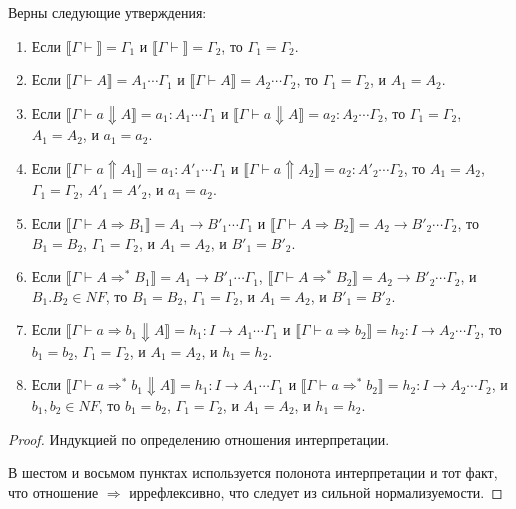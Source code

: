 \documentclass{amsart}
\theoremstyle{definition}
\theoremstyle{remark}
\newcommand{\red}{\Rightarrow}
\renewcommand{\ll}{\llbracket}
\newcommand{\rr}{\rrbracket}
\numberwithin{figure}{section}
\begin{document}
\begin{lem}
Верны следующие утверждения:
\begin{enumerate}
\item Если $\ll \Gamma \vdash \rr = \Gamma_1$ и $\ll \Gamma \vdash \rr = \Gamma_2$, то $\Gamma_1 = \Gamma_2$.
\item Если $\ll \Gamma \vdash A \rr = A_1 \dotsb \Gamma_1$ и $\ll \Gamma \vdash A \rr = A_2 \dotsb \Gamma_2$, то $\Gamma_1 = \Gamma_2$, и $A_1 = A_2$.
\item Если $\ll \Gamma \vdash a \Downarrow A \rr = a_1 : A_1 \dotsb \Gamma_1$ и $\ll \Gamma \vdash a \Downarrow A \rr = a_2 : A_2 \dotsb \Gamma_2$, то $\Gamma_1 = \Gamma_2$, $A_1 = A_2$, и $a_1 = a_2$.
\item Если $\ll \Gamma \vdash a \Uparrow A_1 \rr = a_1 : A'_1 \dotsb \Gamma_1$ и $\ll \Gamma \vdash a \Uparrow A_2 \rr = a_2 : A'_2 \dotsb \Gamma_2$, то $A_1 = A_2$, $\Gamma_1 = \Gamma_2$, $A'_1 = A'_2$, и $a_1 = a_2$.
\item Если $\ll \Gamma \vdash A \red B_1 \rr = A_1 \to B'_1 \dotsb \Gamma_1$ и $\ll \Gamma \vdash A \red B_2 \rr = A_2 \to B'_2 \dotsb \Gamma_2$, то $B_1 = B_2$, $\Gamma_1 = \Gamma_2$, и $A_1 = A_2$, и $B'_1 = B'_2$.
\item Если $\ll \Gamma \vdash A \red^* B_1 \rr = A_1 \to B'_1 \dotsb \Gamma_1$, $\ll \Gamma \vdash A \red^* B_2 \rr = A_2 \to B'_2 \dotsb \Gamma_2$, и $B_1. B_2 \in NF$, то $B_1 = B_2$, $\Gamma_1 = \Gamma_2$, и $A_1 = A_2$, и $B'_1 = B'_2$.
\item Если $\ll \Gamma \vdash a \red b_1 \Downarrow A \rr = h_1 : I \to A_1 \dotsb \Gamma_1$ и $\ll \Gamma \vdash a \red b_2 \rr = h_2 : I \to A_2 \dotsb \Gamma_2$, то $b_1 = b_2$, $\Gamma_1 = \Gamma_2$, и $A_1 = A_2$, и $h_1 = h_2$.
\item Если $\ll \Gamma \vdash a \red^* b_1 \Downarrow A \rr = h_1 : I \to A_1 \dotsb \Gamma_1$ и $\ll \Gamma \vdash a \red^* b_2 \rr = h_2 : I \to A_2 \dotsb \Gamma_2$, и $b_1, b_2 \in NF$, то $b_1 = b_2$, $\Gamma_1 = \Gamma_2$, и $A_1 = A_2$, и $h_1 = h_2$.
\end{enumerate}
\end{lem}
\begin{proof}
Индукцией по определению отношения интерпретации.

В шестом и восьмом пунктах используется полонота интерпретации и тот факт, что отношение $\red$ иррефлексивно, что следует из сильной нормализуемости.
\end{proof}
\end{document}
